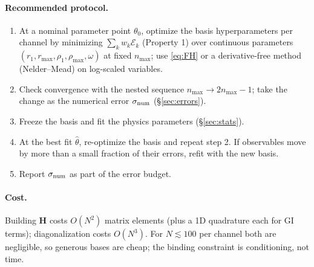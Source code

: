 \documentclass[11pt,a4paper]{article}
\numberwithin{equation}{section}
\theoremstyle{definition}
\theoremstyle{plain}
\theoremstyle{remark}
\numberwithin{algorithm}{section}
\newcommand{\mH}{\mathbf H}
\begin{document}
\paragraph{Recommended protocol.}
\begin{enumerate}[leftmargin=1.5em,itemsep=2pt]
\item At a nominal parameter point $\theta_0$, optimize the basis hyperparameters per channel by minimizing $\sum_kw_k\mathcal E_k$ (Property 1) over continuous parameters $(r_1,r_{\max},\rho_1,\rho_{\max},\omega)$ at fixed $n_{\max}$; use \eqref{eq:FH} or a derivative-free method (Nelder--Mead) on log-scaled variables.
\item Check convergence with the nested sequence $n_{\max}\to2n_{\max}-1$; take the change as the numerical error $\sigma_{\rm num}$ (\S\ref{sec:errors}).
\item Freeze the basis and fit the physics parameters (\S\ref{sec:stats}).
\item At the best fit $\hat\theta$, re-optimize the basis and repeat step 2. If observables move by more than a small fraction of their errors, refit with the new basis.
\item Report $\sigma_{\rm num}$ as part of the error budget.
\end{enumerate}
\paragraph{Cost.} Building $\mH$ costs $O(N^2)$ matrix elements (plus a 1D quadrature each for GI terms); diagonalization costs $O(N^3)$. For $N\lesssim100$ per channel both are negligible, so generous bases are cheap; the binding constraint is conditioning, not time.
\end{document}
